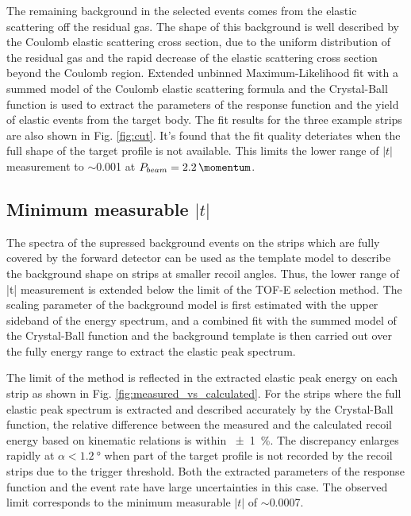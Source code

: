 \documentclass[number,5p]{elsarticle}
\begin{document}
The remaining background in the selected events comes from the elastic scattering off the residual gas.
The shape of this background is well described by the Coulomb elastic scattering cross
section, due to the uniform distribution of the residual gas and the rapid decrease of the elastic scattering cross section beyond the Coulomb region.
Extended unbinned Maximum-Likelihood fit with a summed model of the Coulomb elastic scattering formula and the Crystal-Ball
function is used to extract the parameters of the response function and the yield of elastic events from the target body. 
The fit results for the three example strips are also shown in Fig. \ref{fig:cut}.
It's found that the fit quality deteriates when the full shape of the target profile is not available.
This limits the lower range of $|t|$ measurement to $\sim$\SI{0.001}{\tmom} at $P_{beam}=\SI{2.2}{\momentum}$.

\subsection{Minimum measurable $|t|$}
\label{sec:minimum_t}
The spectra of the supressed background events on the strips which are fully covered by the
forward detector can be used as the template model to describe the background
shape on strips at smaller recoil angles.
Thus, the lower range of |t| measurement is extended below the limit of the TOF-E selection method.
The scaling parameter of the background model is first estimated with the upper
sideband of the energy spectrum, and a combined fit with the summed
model of the Crystal-Ball function and the background template is then carried
out over the fully energy range to extract the elastic peak spectrum.

The limit of the method is reflected in the extracted elastic peak energy on each strip as shown in
Fig. \ref{fig:measured_vs_calculated}.
For the strips where the full elastic peak spectrum is extracted and described accurately
by the Crystal-Ball function, the relative difference between the measured and
the calculated recoil energy based on kinematic relations is within \SI{\pm 1}{\percent}.
The discrepancy enlarges rapidly at $\alpha < \SI{1.2}{\degree}$ when part of
the target profile is not recorded by the recoil strips due to the trigger threshold.
Both the extracted parameters of the response function and the event rate have large uncertainties in this case.
The observed limit corresponds to the minimum measurable $|t|$ of $\sim$\SI{0.0007}{\tmom}.
\end{document}
